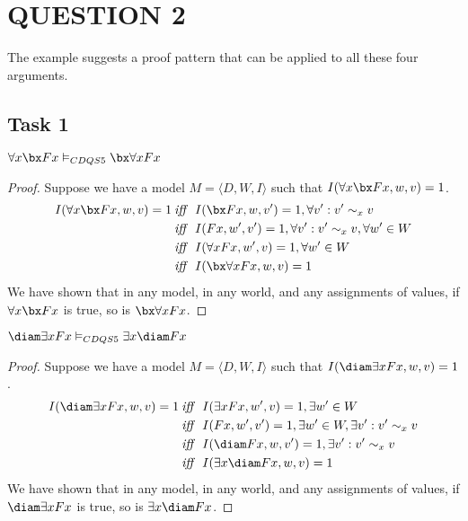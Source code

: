 \section*{QUESTION 2}
The example suggests a proof pattern that can be applied to all these four arguments.

\subsection*{Task 1}

\begin{claim}
$\forall x \bx Fx \vDash_{CDQS5} \bx \forall x Fx$
\end{claim}

\begin{proof}
Suppose we have a model $M = \langle D, W, I \rangle$ such that $I(\forall x \bx Fx, w, v) = 1$.
\begin{align*}
I(\forall x \bx Fx, w, v) = 1
&\mathbin{\mathit{iff}}\ I(\bx Fx, w, v') = 1, \forall v': v' \sim_x v \\
&\mathbin{\mathit{iff}}\ I(Fx, w', v') = 1, \forall v': v' \sim_x v, \forall w' \in W \\
&\mathbin{\mathit{iff}}\ I(\forall x Fx, w', v) = 1, \forall w' \in W \\
&\mathbin{\mathit{iff}}\ I(\bx \forall x Fx, w, v) = 1
\end{align*}
We have shown that in any model, in any world, and any assignments of values, if $\forall x \bx Fx$ is true, so is $\bx \forall x Fx$.
\end{proof}

\begin{claim}
$\diam \exists x Fx \vDash_{CDQS5} \exists x \diam Fx$
\end{claim}

\begin{proof}
Suppose we have a model $M = \langle D, W, I \rangle$ such that $I(\diam \exists x Fx, w, v) = 1$.
\begin{align*}
I(\diam \exists x Fx, w, v) = 1
&\mathbin{\mathit{iff}}\ I(\exists x Fx, w', v) = 1, \exists w' \in W \\
&\mathbin{\mathit{iff}}\ I(Fx, w', v') = 1, \exists w' \in W, \exists v': v' \sim_x v \\
&\mathbin{\mathit{iff}}\ I(\diam Fx, w, v') = 1, \exists v': v' \sim_x v \\
&\mathbin{\mathit{iff}}\ I(\exists x \diam Fx, w, v) = 1
\end{align*}
We have shown that in any model, in any world, and any assignments of values, if $\diam \exists x Fx$ is true, so is $\exists x \diam Fx$.
\end{proof}


